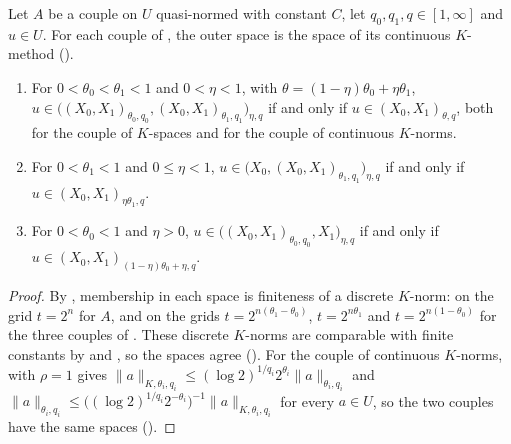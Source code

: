\begin{theorem}
\label{thm:reiteration}
\leanok
{}
Let $A$ be a couple on $U$ quasi-normed with constant $C$, let $q_0, q_1, q \in [1, \infty]$ and
$u \in U$. For each couple of , the outer space is the space of its
continuous $K$-method ().
\begin{enumerate}
  \item For $0 < \theta_0 < \theta_1 < 1$ and $0 < \eta < 1$, with
    $\theta = (1 - \eta)\theta_0 + \eta\theta_1$,
    $u \in \bigl((X_0, X_1)_{\theta_0, q_0}, (X_0, X_1)_{\theta_1, q_1}\bigr)_{\eta, q}$ if and
    only if $u \in (X_0, X_1)_{\theta, q}$, both for the couple of $K$-spaces and for the couple of
    continuous $K$-norms.
  \item For $0 < \theta_1 < 1$ and $0 \leq \eta < 1$,
    $u \in \bigl(X_0, (X_0, X_1)_{\theta_1, q_1}\bigr)_{\eta, q}$ if and only if
    $u \in (X_0, X_1)_{\eta\theta_1, q}$.
  \item For $0 < \theta_0 < 1$ and $\eta > 0$,
    $u \in \bigl((X_0, X_1)_{\theta_0, q_0}, X_1\bigr)_{\eta, q}$ if and only if
    $u \in (X_0, X_1)_{(1-\eta)\theta_0 + \eta, q}$.
\end{enumerate}
\end{theorem}

\begin{proof}
\leanok
By , membership in each space is finiteness of a discrete
$K$-norm: on the grid $t = 2^n$ for $A$, and on the grids $t = 2^{n(\theta_1 - \theta_0)}$,
$t = 2^{n\theta_1}$ and $t = 2^{n(1-\theta_0)}$ for the three couples of
. These discrete $K$-norms are comparable with finite constants by
 and , so the spaces agree
(). For the couple of continuous
$K$-norms,  with $\rho = 1$ gives
$\|a\|_{K, \theta_i, q_i} \leq (\log 2)^{1/q_i} 2^{\theta_i} \|a\|_{\theta_i, q_i}$ and
$\|a\|_{\theta_i, q_i} \leq \bigl((\log 2)^{1/q_i} 2^{-\theta_i}\bigr)^{-1} \|a\|_{K, \theta_i,
q_i}$ for every $a \in U$, so the two couples have the same spaces
().
\end{proof}

